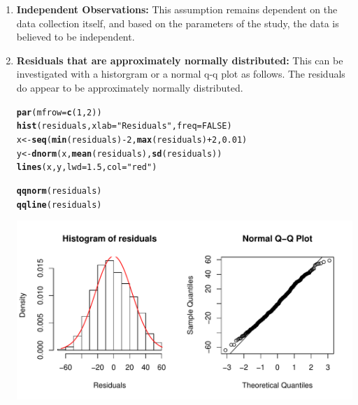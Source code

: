\documentclass{report}\usepackage[]{graphicx}\usepackage[]{color}
\makeatletter
\def\maxwidth{ %
  \ifdim\Gin@nat@width>\linewidth
    \linewidth
  \else
    \Gin@nat@width
  \fi
}
\newcommand{\hlnum}[1]{\textcolor[rgb]{0.686,0.059,0.569}{#1}}%
\newcommand{\hlstr}[1]{\textcolor[rgb]{0.192,0.494,0.8}{#1}}%
\newcommand{\hlopt}[1]{\textcolor[rgb]{0,0,0}{#1}}%
\newcommand{\hlstd}[1]{\textcolor[rgb]{0.345,0.345,0.345}{#1}}%
\newcommand{\hlkwb}[1]{\textcolor[rgb]{0.69,0.353,0.396}{#1}}%
\newcommand{\hlkwc}[1]{\textcolor[rgb]{0.333,0.667,0.333}{#1}}%
\newcommand{\hlkwd}[1]{\textcolor[rgb]{0.737,0.353,0.396}{\textbf{#1}}}%
\newenvironment{kframe}{%
 \def\at@end@of@kframe{}%
 \ifinner\ifhmode%
  \def\at@end@of@kframe{\end{minipage}}%
  \begin{minipage}{\columnwidth}%
 \fi\fi%
 \def\FrameCommand##1{\hskip\@totalleftmargin \hskip-\fboxsep
 \colorbox{shadecolor}{##1}\hskip-\fboxsep
     \hskip-\linewidth \hskip-\@totalleftmargin \hskip\columnwidth}%
 \MakeFramed {\advance\hsize-\width
   \@totalleftmargin\z@ \linewidth\hsize
   \@setminipage}}%
 {\par\unskip\endMakeFramed%
 \at@end@of@kframe}
\newenvironment{knitrout}{}{} %
\makeatother
\begin{document}
\begin{enumerate}
\item \textbf{Independent Observations:} This assumption remains dependent on the data collection itself, and based on the parameters of the study, the data is believed to be independent.  

\item \textbf{Residuals that are approximately normally distributed:} This can be investigated with a historgram or a normal q-q plot as follows.  The residuals do appear to be approximately normally distributed.  
\begin{knitrout}
\color{fgcolor}\begin{kframe}
\begin{alltt}
\hlkwd{par}\hlstd{(}\hlkwc{mfrow} \hlstd{=} \hlkwd{c}\hlstd{(}\hlnum{1}\hlstd{,} \hlnum{2}\hlstd{))}
\hlkwd{hist}\hlstd{(residuals,} \hlkwc{xlab} \hlstd{=} \hlstr{"Residuals"}\hlstd{,} \hlkwc{freq} \hlstd{=} \hlnum{FALSE}\hlstd{)}
\hlstd{x} \hlkwb{<-} \hlkwd{seq}\hlstd{(}\hlkwd{min}\hlstd{(residuals)} \hlopt{-} \hlnum{2}\hlstd{,} \hlkwd{max}\hlstd{(residuals)} \hlopt{+} \hlnum{2}\hlstd{,} \hlnum{0.01}\hlstd{)}
\hlstd{y} \hlkwb{<-} \hlkwd{dnorm}\hlstd{(x,} \hlkwd{mean}\hlstd{(residuals),} \hlkwd{sd}\hlstd{(residuals))}
\hlkwd{lines}\hlstd{(x, y,} \hlkwc{lwd} \hlstd{=} \hlnum{1.5}\hlstd{,} \hlkwc{col} \hlstd{=} \hlstr{"red"}\hlstd{)}

\hlkwd{qqnorm}\hlstd{(residuals)}
\hlkwd{qqline}\hlstd{(residuals)}
\end{alltt}
\end{kframe}

{\centering \includegraphics[width=\maxwidth]{figure/unnamed-chunk-112-1} 

}



\end{knitrout}

\end{enumerate}
\end{document}
